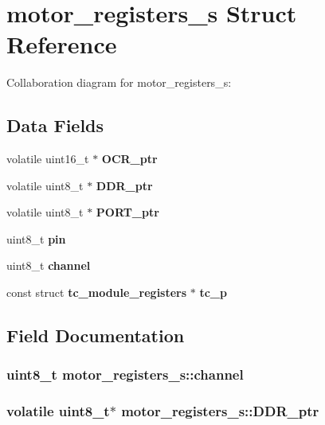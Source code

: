 \section{motor\+\_\+registers\+\_\+s Struct Reference}
\label{structmotor__registers__s}


Collaboration diagram for motor\+\_\+registers\+\_\+s\+:
\subsection*{Data Fields}
\begin{DoxyCompactItemize}
\item 
volatile uint16\+\_\+t $\ast$ {\bf O\+C\+R\+\_\+ptr}
\item 
volatile uint8\+\_\+t $\ast$ {\bf D\+D\+R\+\_\+ptr}
\item 
volatile uint8\+\_\+t $\ast$ {\bf P\+O\+R\+T\+\_\+ptr}
\item 
uint8\+\_\+t {\bf pin}
\item 
uint8\+\_\+t {\bf channel}
\item 
const struct {\bf tc\+\_\+module\+\_\+registers} $\ast$ {\bf tc\+\_\+p}
\end{DoxyCompactItemize}


\subsection{Field Documentation}
\subsubsection[{channel}]{\setlength{\rightskip}{0pt plus 5cm}uint8\+\_\+t motor\+\_\+registers\+\_\+s\+::channel}\label{structmotor__registers__s_a759cd205c48cbbd49b0722c44d7a6717}
\subsubsection[{D\+D\+R\+\_\+ptr}]{\setlength{\rightskip}{0pt plus 5cm}volatile uint8\+\_\+t$\ast$ motor\+\_\+registers\+\_\+s\+::\+D\+D\+R\+\_\+ptr}\label{structmotor__registers__s_a69a589af1b6e1a8db9758d0f5fa65e37}
